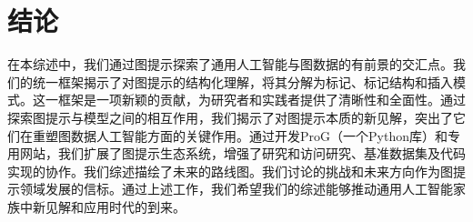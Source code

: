 \section{结论}\label{sec:con}
在本综述中，我们通过图提示探索了通用人工智能与图数据的有前景的交汇点。我们的统一框架揭示了对图提示的结构化理解，将其分解为标记、标记结构和插入模式。这一框架是一项新颖的贡献，为研究者和实践者提供了清晰性和全面性。通过探索图提示与模型之间的相互作用，我们揭示了对图提示本质的新见解，突出了它们在重塑图数据人工智能方面的关键作用。通过开发ProG（一个Python库）和专用网站，我们扩展了图提示生态系统，增强了研究和访问研究、基准数据集及代码实现的协作。我们综述描绘了未来的路线图。我们讨论的挑战和未来方向作为图提示领域发展的信标。通过上述工作，我们希望我们的综述能够推动通用人工智能家族中新见解和应用时代的到来。
